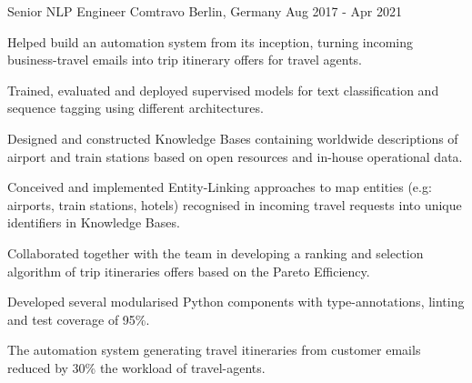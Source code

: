 \begin{cventries}
  \cventry
    {Senior NLP Engineer}
    {Comtravo} %
    {Berlin, Germany} %
    {Aug 2017 - Apr 2021} %
    {
      \begin{cvitems}
		\item {Helped build an automation system from its inception, turning incoming business-travel emails into trip itinerary offers for travel agents.}
		\item {Trained, evaluated and deployed supervised models for text classification and sequence tagging using different architectures.}
		\item {Designed and constructed Knowledge Bases containing worldwide descriptions of airport and train stations based on open resources and in-house operational data.}
		\item {Conceived and implemented Entity-Linking approaches to map entities (e.g: airports, train stations, hotels) recognised in incoming travel requests into unique identifiers in Knowledge Bases.}
		\item {Collaborated together with the team in developing a ranking and selection algorithm of trip itineraries offers based on the Pareto Efficiency.}
		\item {Developed several modularised Python components with type-annotations, linting and test coverage of 95\%.}
		\item {The automation system generating travel itineraries from customer emails reduced by 30\% the workload of travel-agents.}
        \end{cvitems}
 	}

\end{cventries}
